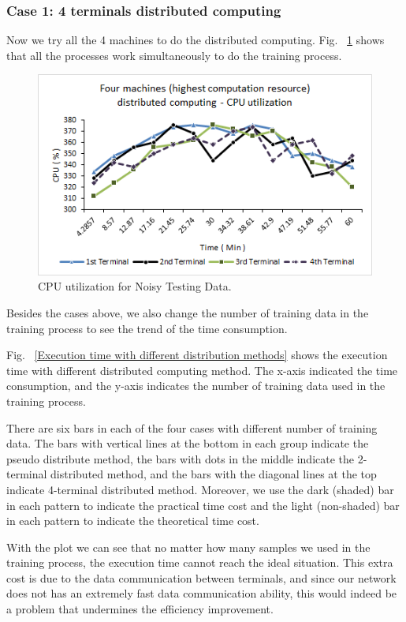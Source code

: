 \subsubsection*{Case 1: 4 terminals distributed computing}

Now we try all the 4 machines to do the distributed computing. Fig. ~\ref{CPU utilization in case 3} shows that all the processes work simultaneously to do the training process.

\begin {figure}[t]
\centering
\includegraphics[width=0.9\columnwidth]{Paper_Fig13_CPU_Case3.png} %
\caption{CPU utilization for Noisy Testing Data.}
\label{CPU utilization in case 3}
\end {figure}

Besides the cases above, we also change the number of training data in the training process to see the trend of the time consumption.

Fig. ~\ref{Execution time with different distribution methods} shows the execution time with different distributed computing method. The x-axis indicated the time consumption, and the y-axis indicates the number of training data used in the training process.

There are six bars in each of the four cases with different number of training data. The bars with vertical lines at the bottom in each group indicate the pseudo distribute method, the bars with dots in the middle indicate the 2-terminal distributed method, and the bars with the diagonal lines at the top indicate 4-terminal distributed method. Moreover, we use the dark (shaded) bar in each pattern to indicate the practical time cost and the light (non-shaded) bar in each pattern to indicate the theoretical time cost.

With the plot we can see that no matter how many samples we used in the training process, the execution time cannot reach the ideal situation. This extra cost is due to the data communication between terminals, and since our network does not has an extremely fast data communication ability, this would indeed be a problem that undermines the efficiency improvement.


